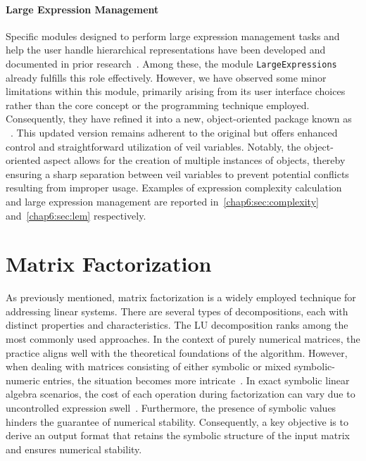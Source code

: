 \paragraph{Large Expression Management} Specific modules designed to perform large expression management tasks and help the user handle hierarchical representations have been developed and documented in prior research~\cite{carette2006linear, zhou2007symbolic}. Among these, the \Maple{} module \texttt{LargeExpressions} already fulfills this role effectively. However, we have observed some minor limitations within this module, primarily arising from its user interface choices rather than the core concept or the programming technique employed. Consequently, they have refined it into a new, object-oriented package known as \LEM{}~\cite{lem}. This updated version remains adherent to the original but offers enhanced control and straightforward utilization of veil variables. Notably, the object-oriented aspect allows for the creation of multiple instances of \LEM{} objects, thereby ensuring a sharp separation between veil variables to prevent potential conflicts resulting from improper usage. Examples of expression complexity calculation and large expression management are reported in~\ref{chap6:sec:complexity} and~\ref{chap6:sec:lem} respectively.


\section{Matrix Factorization}
\label{chap6:sec:matrix_factorization}

As previously mentioned, matrix factorization is a widely employed technique for addressing linear systems. There are several types of decompositions, each with distinct properties and characteristics. The \ac{LU} decomposition ranks among the most commonly used approaches. In the context of purely numerical matrices, the practice aligns well with the theoretical foundations of the algorithm. However, when dealing with matrices consisting of either symbolic or mixed symbolic-numeric entries, the situation becomes more intricate~\cite{zhou2007symbolic}. In exact symbolic linear algebra scenarios, the cost of each operation during factorization can vary due to uncontrolled expression swell~\cite{zhou2006hierarchical}. Furthermore, the presence of symbolic values hinders the guarantee of numerical stability. Consequently, a key objective is to derive an output format that retains the symbolic structure of the input matrix and ensures numerical stability.

